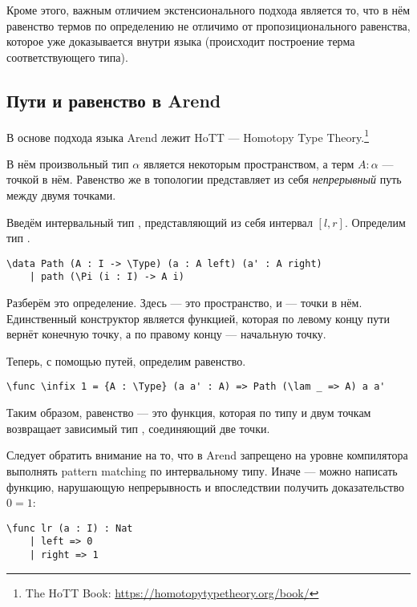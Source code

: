 Кроме этого, важным отличием экстенсионального подхода является то, что в нём равенство термов по определению
не отличимо от пропозиционального равенства, которое уже доказывается внутри языка (происходит построение терма соответствующего типа).

\subsection{Пути и равенство в Arend}
В основе подхода языка Arend лежит HoTT --- Homotopy Type Theory.\footnote{The HoTT Book: \url{https://homotopytypetheory.org/book/}}

В нём произвольный тип $\alpha$ является некоторым пространством, а терм $A : \alpha$ --- точкой в нём.
Равенство же в топологии представляет из себя \textit{непрерывный} путь между двумя точками.

Введём интервальный тип , представляющий из себя интервал $[l, r]$.
Определим тип .

\begin{verbatim}
\data Path (A : I -> \Type) (a : A left) (a' : A right)
    | path (\Pi (i : I) -> A i)
\end{verbatim} 

Разберём это определение. Здесь  --- это пространство,  и  --- точки в нём.
Единственный конструктор является функцией, которая по левому концу пути вернёт конечную точку, а по правому концу --- начальную точку.

Теперь, с помощью путей, определим равенство.

\begin{verbatim}
\func \infix 1 = {A : \Type} (a a' : A) => Path (\lam _ => A) a a'
\end{verbatim}

Таким образом, равенство --- это функция, которая по типу и двум точкам возвращает
зависимый тип , соединяющий две точки.

Следует обратить внимание на то, что в Arend запрещено на уровне компилятора выполнять
pattern matching по интервальному типу.
Иначе --- можно написать функцию, нарушающую непрерывность и впоследствии получить доказательство $0 = 1$:

\begin{verbatim}
\func lr (a : I) : Nat
    | left => 0
    | right => 1
\end{verbatim}

